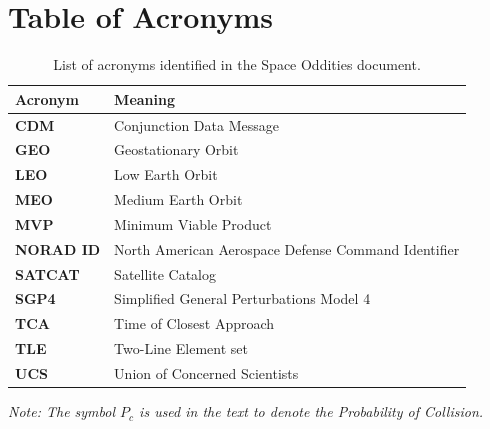 \section*{Table of Acronyms}

\begin{table}[h]
\centering
\renewcommand{\arraystretch}{1.5}
\begin{tabular}{@{}>{\bfseries}l p{10cm}@{}}
\toprule
Acronym & Meaning \\ \midrule
CDM & Conjunction Data Message  \\
GEO & Geostationary Orbit  \\
LEO & Low Earth Orbit  \\
MEO & Medium Earth Orbit  \\
MVP & Minimum Viable Product \\
NORAD ID & North American Aerospace Defense Command Identifier \\
SATCAT & Satellite Catalog \\
SGP4 & Simplified General Perturbations Model 4  \\
TCA & Time of Closest Approach  \\
TLE & Two-Line Element set  \\
UCS & Union of Concerned Scientists \\ \bottomrule
\end{tabular}
\caption{List of acronyms identified in the Space Oddities document.}
\end{table}

\noindent \textit{Note: The symbol $P_c$ is used in the text to denote the Probability of Collision.}